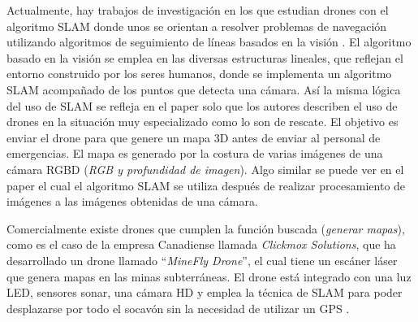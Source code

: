 Actualmente, hay trabajos de investigación en los que estudian drones con el algoritmo SLAM 
donde unos se orientan a resolver problemas de navegación utilizando algoritmos de seguimiento 
de líneas basados en la visión \cite{Verschoor2013}. El algoritmo basado en la visión se 
emplea en las diversas estructuras lineales, que reflejan el entorno construido por los 
seres humanos, donde se implementa un algoritmo SLAM acompañado de los puntos que detecta 
una cámara. Así la misma lógica del uso de SLAM se refleja en el paper \cite{Skoda2015} 
solo que los autores describen el uso de drones en la situación muy especializado como lo 
son de rescate. El objetivo es enviar el drone para que genere un mapa 3D antes de enviar 
al personal de emergencias. El mapa es generado por la costura de varias imágenes de una 
cámara RGBD (\textit{RGB y profundidad de imagen}). Algo similar se puede ver en el 
paper \cite{Heukels2015} el cual el algoritmo SLAM se utiliza después de realizar 
procesamiento de imágenes a las imágenes obtenidas de una cámara.

Comercialmente existe drones que cumplen la función buscada (\textit{generar mapas}), como 
es el caso de la empresa Canadiense llamada \textit{Clickmox Solutions}, que ha 
desarrollado un drone llamado “\textit{MineFly Drone}”, el cual tiene un escáner 
láser que genera mapas en las minas subterráneas. El drone está integrado con una 
luz LED, sensores sonar, una cámara HD y emplea la técnica de SLAM para poder 
desplazarse por todo el socavón sin la necesidad de utilizar un GPS \cite{Solutions2016}. 


